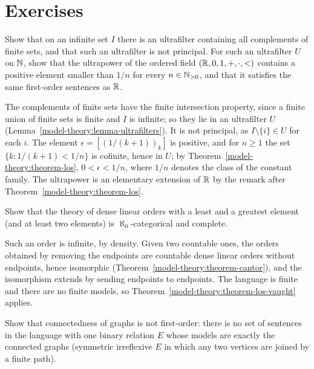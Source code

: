\section{Exercises}\label{model-theory:section-exercises}

\begin{exercise}\label{model-theory:exercise-infinitesimals}
Show that on an infinite set $I$ there is an ultrafilter containing all complements of finite sets, and that such an ultrafilter is not principal. For such an
ultrafilter $U$ on $\mathbb{N}$, show that the ultrapower of the ordered field $(\mathbb{R}, 0, 1, +, \cdot, <)$ contains a positive element smaller than $1/n$ for every
$n \in \mathbb{N}_{>0}$, and that it satisfies the same first-order sentences as $\mathbb{R}$.
\end{exercise}

\begin{solution}
The complements of finite sets have the finite intersection property, since a finite union of finite sets is finite and $I$ is infinite; so they lie in an
ultrafilter $U$ (Lemma~\ref{model-theory:lemma-ultrafilters}). It is not principal, as $I \setminus \{i\} \in U$ for each $i$. The element
$\epsilon = [(1/(k + 1))_k]$ is positive, and for $n \geq 1$ the set $\{k : 1/(k + 1) < 1/n\}$ is cofinite, hence in $U$; by
Theorem~\ref{model-theory:theorem-los}, $0 < \epsilon < 1/n$, where $1/n$ denotes the class of the constant family. The ultrapower is an elementary extension of
$\mathbb{R}$ by the remark after Theorem~\ref{model-theory:theorem-los}.
\end{solution}

\begin{exercise}\label{model-theory:exercise-dlo-endpoints}
Show that the theory of dense linear orders with a least and a greatest element (and at least two elements) is $\aleph_0$-categorical and complete.
\end{exercise}

\begin{solution}
Such an order is infinite, by density. Given two countable ones, the orders obtained by removing the endpoints are countable dense linear orders without
endpoints, hence isomorphic (Theorem~\ref{model-theory:theorem-cantor}), and the isomorphism extends by sending endpoints to endpoints. The language is finite
and there are no finite models, so Theorem~\ref{model-theory:theorem-los-vaught} applies.
\end{solution}

\begin{exercise}\label{model-theory:exercise-connectedness}
Show that connectedness of graphs is not first-order: there is no set of sentences in the language with one binary relation $E$ whose models are exactly the
connected graphs (symmetric irreflexive $E$ in which any two vertices are joined by a finite path).
\end{exercise}

